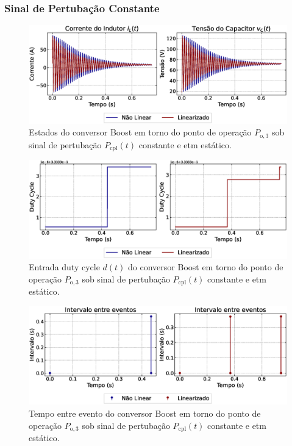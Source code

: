 \subsubsection{Sinal de Pertubação Constante}

\begin{figure}[H]
  \centering
  \captionsetup{justification=centering}
  \includegraphics[width=1.\textwidth]{figuras/static-etm/boost/sim1/op1/result.eps}
  \caption{Estados do conversor Boost em torno do ponto de operação $P_{\mathrm{o}, 3}$ sob sinal de pertubação $P_{\mathrm{cpl}}(t)$ constante e \acrshort{etm} estático.}
\end{figure}

\begin{figure}[H]
  \centering
  \captionsetup{justification=centering}
  \includegraphics[width=1.\textwidth]{figuras/static-etm/boost/sim1/op1/duty-cycle.eps}
  \caption{Entrada duty cycle $d(t)$ do conversor Boost em torno do ponto de operação $P_{\mathrm{o}, 3}$ sob sinal de pertubação $P_{\mathrm{cpl}}(t)$ constante e \acrshort{etm} estático.}
\end{figure}

\begin{figure}[H]
  \centering
  \captionsetup{justification=centering}
  \includegraphics[width=1.\textwidth]{figuras/static-etm/boost/sim1/op1/inter-event-times.eps}
  \caption{Tempo entre evento do conversor Boost em torno do ponto de operação $P_{\mathrm{o}, 3}$ sob sinal de pertubação $P_{\mathrm{cpl}}(t)$ constante e \acrshort{etm} estático.}
\end{figure}

